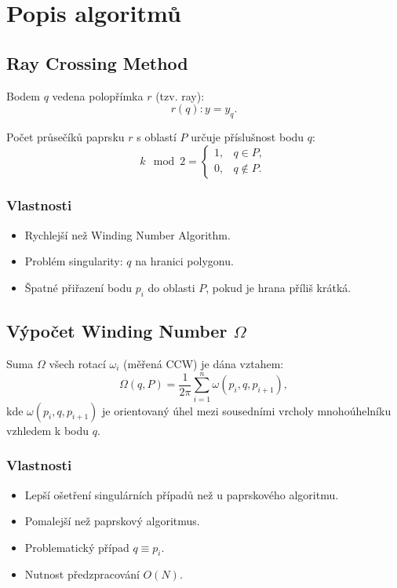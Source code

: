 \newpage
\section{Popis algoritmů}

\subsection{Ray Crossing Method}
Bodem $q$ vedena polopřímka $r$ (tzv. ray):
\begin{equation}
    r(q): y = y_q.
\end{equation}

Počet průsečíků paprsku $r$ s oblastí $P$ určuje příslušnost bodu $q$:
\begin{equation}
    k \mod 2 =
    \begin{cases}
        1, & q \in P, \\
        0, & q \notin P.
    \end{cases}
\end{equation}

\subsubsection{Vlastnosti}
\begin{itemize}
    \item Rychlejší než Winding Number Algorithm.
    \item Problém singularity: $q$ na hranici polygonu.
    \item Špatné přiřazení bodu $p_i$ do oblasti $P$, pokud je hrana příliš krátká.
\end{itemize}


\newpage

\subsection{Výpočet Winding Number $\Omega$}
Suma $\Omega$ všech rotací $\omega_i$ (měřená CCW) je dána vztahem:
\begin{equation}
    \Omega(q, P) = \frac{1}{2\pi} \sum_{i=1}^{n} \omega(p_i, q, p_{i+1}),
\end{equation}
kde $\omega(p_i, q, p_{i+1})$ je orientovaný úhel mezi sousedními vrcholy mnohoúhelníku vzhledem k bodu $q$.

\subsubsection{Vlastnosti}
\begin{itemize}
    \item Lepší ošetření singulárních případů než u paprskového algoritmu.
    \item Pomalejší než paprskový algoritmus.
    \item Problematický případ $q \equiv p_i$.
    \item Nutnost předzpracování $O(N)$.
\end{itemize}

